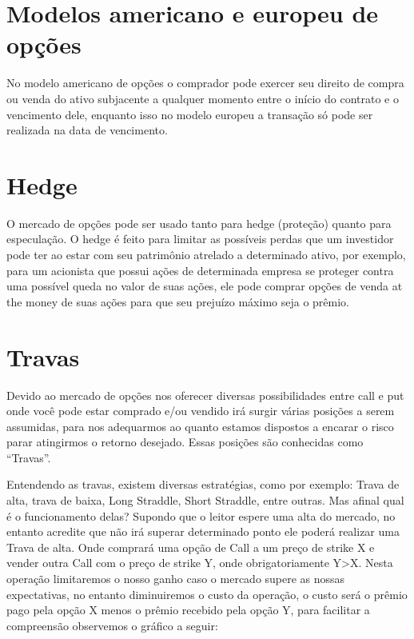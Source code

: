 \documentclass[]{book}
\theoremstyle{definition}
\theoremstyle{definition}
\theoremstyle{definition}
\theoremstyle{remark}
\begin{document}
\section{Modelos americano e europeu de
opções}\label{modelos-americano-e-europeu-de-opcoes}

No modelo americano de opções o comprador pode exercer seu direito de
compra ou venda do ativo subjacente a qualquer momento entre o início do
contrato e o vencimento dele, enquanto isso no modelo europeu a
transação só pode ser realizada na data de vencimento.

\section{Hedge}\label{hedge}

O mercado de opções pode ser usado tanto para hedge (proteção) quanto
para especulação. O hedge é feito para limitar as possíveis perdas que
um investidor pode ter ao estar com seu patrimônio atrelado a
determinado ativo, por exemplo, para um acionista que possui ações de
determinada empresa se proteger contra uma possível queda no valor de
suas ações, ele pode comprar opções de venda at the money de suas ações
para que seu prejuízo máximo seja o prêmio.

\section{Travas}\label{travas}

Devido ao mercado de opções nos oferecer diversas possibilidades entre
call e put onde você pode estar comprado e/ou vendido irá surgir várias
posições a serem assumidas, para nos adequarmos ao quanto estamos
dispostos a encarar o risco parar atingirmos o retorno desejado. Essas
posições são conhecidas como ``Travas''.

Entendendo as travas, existem diversas estratégias, como por exemplo:
Trava de alta, trava de baixa, Long Straddle, Short Straddle, entre
outras. Mas afinal qual é o funcionamento delas? Supondo que o leitor
espere uma alta do mercado, no entanto acredite que não irá superar
determinado ponto ele poderá realizar uma Trava de alta. Onde comprará
uma opção de Call a um preço de strike X e vender outra Call com o preço
de strike Y, onde obrigatoriamente Y\textgreater{}X. Nesta operação
limitaremos o nosso ganho caso o mercado supere as nossas expectativas,
no entanto diminuiremos o custo da operação, o custo será o prêmio pago
pela opção X menos o prêmio recebido pela opção Y, para facilitar a
compreensão observemos o gráfico a seguir:
\end{document}
